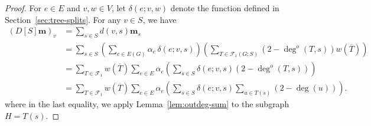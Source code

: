 \documentclass{amsart}
\theoremstyle{definition}
\newcommand{\boldm}{\mathbf{m}}
\newcommand{\trees}{\mathcal{F}_1}
\newcommand{\degout}{\deg^o}
\begin{document}
\begin{proof}
For $e\in E$ and $v,w\in V$, let $\delta(e;v,w)$ denote the function defined in Section~\ref{sec:tree-splits}.
For any $v \in S$, we have
\begin{align}
  (D[S] \boldm)_v &= \sum_{s \in S} d(v,s) \boldm_s \\
  &= \sum_{s \in S} \left( \sum_{e \in E(G)} \alpha_e\, \delta(e; v,s) \right) \left( \sum_{T \in \trees(G;S)} (2 - \degout(T,s)) w(\overline{T}) \right) \\
  &= \sum_{T\in \trees} w(\overline{T}) \sum_{e\in E} \alpha_e \left( \sum_{s \in S} \delta(e; v,s) (2 - \degout(T, s)) \right) \\
  &= \sum_{T \in \trees} w(\overline{T}) \sum_{e \in E} \alpha_e \left( \sum_{s \in S} \delta(e; v,s) \sum_{u \in T(s)} (2 - \deg(u)) \right). \label{eq:14-1}
\end{align}
where in the last equality, we apply Lemma~\ref{lem:outdeg-sum} to the subgraph $H = T(s)$.


\end{proof}
\end{document}
